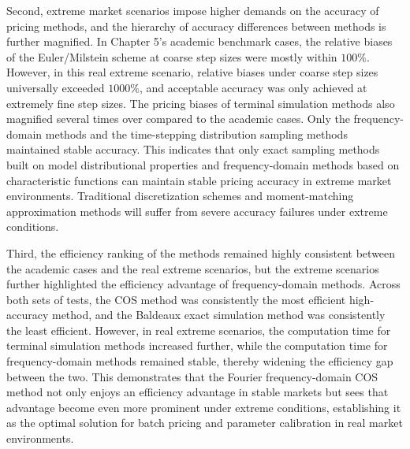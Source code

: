 Second, extreme market scenarios impose higher demands on the accuracy of pricing methods, and the hierarchy of accuracy differences between methods is further magnified. In Chapter 5's academic benchmark cases, the relative biases of the Euler/Milstein scheme at coarse step sizes were mostly within $100\%$. However, in this real extreme scenario, relative biases under coarse step sizes universally exceeded $1000\%$, and acceptable accuracy was only achieved at extremely fine step sizes. The pricing biases of terminal simulation methods also magnified several times over compared to the academic cases. Only the frequency-domain methods and the time-stepping distribution sampling methods maintained stable accuracy. This indicates that only exact sampling methods built on model distributional properties and frequency-domain methods based on characteristic functions can maintain stable pricing accuracy in extreme market environments. Traditional discretization schemes and moment-matching approximation methods will suffer from severe accuracy failures under extreme conditions.

Third, the efficiency ranking of the methods remained highly consistent between the academic cases and the real extreme scenarios, but the extreme scenarios further highlighted the efficiency advantage of frequency-domain methods. Across both sets of tests, the COS method was consistently the most efficient high-accuracy method, and the Baldeaux exact simulation method was consistently the least efficient. However, in real extreme scenarios, the computation time for terminal simulation methods increased further, while the computation time for frequency-domain methods remained stable, thereby widening the efficiency gap between the two. This demonstrates that the Fourier frequency-domain COS method not only enjoys an efficiency advantage in stable markets but sees that advantage become even more prominent under extreme conditions, establishing it as the optimal solution for batch pricing and parameter calibration in real market environments.

